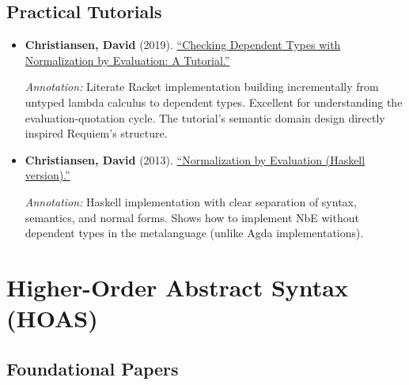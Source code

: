 \documentclass[11pt]{article}
\begin{document}
\subsection{Practical Tutorials}

\begin{itemize}[leftmargin=*]
\item \textbf{Christiansen, David} (2019). \href{http://davidchristiansen.dk/tutorials/nbe/}{``Checking Dependent Types with Normalization by Evaluation: A Tutorial.''}

\textit{Annotation:} Literate Racket implementation building incrementally from untyped lambda calculus to dependent types. Excellent for understanding the evaluation-quotation cycle. The tutorial's semantic domain design directly inspired Requiem's structure.

\item \textbf{Christiansen, David} (2013). \href{http://davidchristiansen.dk/tutorials/implementing-types-hs.pdf}{``Normalization by Evaluation (Haskell version).''}

\textit{Annotation:} Haskell implementation with clear separation of syntax, semantics, and normal forms. Shows how to implement NbE without dependent types in the metalanguage (unlike Agda implementations).

\end{itemize}

\section{Higher-Order Abstract Syntax (HOAS)}

\subsection{Foundational Papers}
\end{document}
